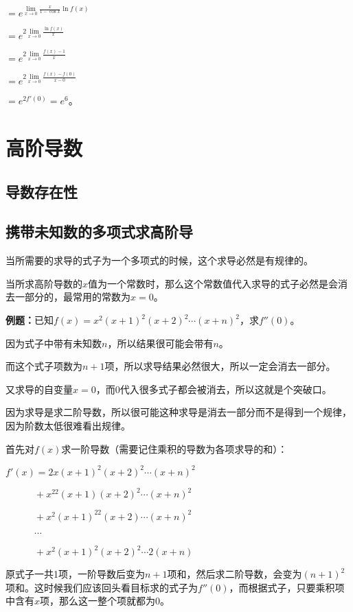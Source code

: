 \documentclass[UTF8, 12pt]{ctexart}
\begin{document}
$=e^{\lim\limits_{x\to 0}\frac{x}{1-\cos x}\ln f(x)}$

$=e^{2\lim\limits_{x\to 0}\frac{\ln f(x)}{x}}$

$=e^{2\lim\limits_{x\to 0}\frac{f(x)-1}{x}}$

$=e^{2\lim\limits_{x\to 0}\frac{f(x)-f(0)}{x-0}}$

$=e^{2f'(0)}=e^6$。

\section{高阶导数}

\subsection{导数存在性}

\subsection{携带未知数的多项式求高阶导}

当所需要的求导的式子为一个多项式的时候，这个求导必然是有规律的。

当所求高阶导数的$x$值为一个常数时，那么这个常数值代入求导的式子必然是会消去一部分的，最常用的常数为$x=0$。

\textbf{例题：}已知$f(x)=x^2(x+1)^2(x+2)^2\cdots(x+n)^2$，求$f''(0)$。

因为式子中带有未知数$n$，所以结果很可能会带有$n$。

而这个式子项数为$n+1$项，所以求导结果必然很大，所以一定会消去一部分。

又求导的自变量$x=0$，而0代入很多式子都会被消去，所以这就是个突破口。

因为求导是求二阶导数，所以很可能这种求导是消去一部分而不是得到一个规律，因为阶数太低很难看出规律。

首先对$f(x)$求一阶导数（需要记住乘积的导数为各项求导的和）：

$f'(x)=2x(x+1)^2(x+2)^2\cdots(x+n)^2$

$\quad\quad\quad+x^22(x+1)(x+2)^2\cdots(x+n)^2$

$\quad\quad\quad+x^2(x+1)^22(x+2)\cdots(x+n)^2$

$\quad\quad\quad\cdots$

$\quad\quad\quad+x^2(x+1)^2(x+2)^2\cdots 2(x+n)$

原式子一共1项，一阶导数后变为$n+1$项和，然后求二阶导数，会变为$(n+1)^2$项和。这时候我们应该回头看目标求的式子为$f''(0)$，而根据式子，只要乘积项中含有$x$项，那么这一整个项就都为0。
\end{document}

